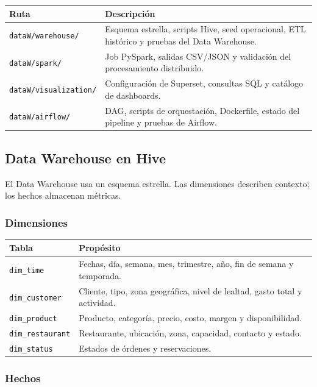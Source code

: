 \documentclass[12pt,letterpaper]{article}
\def\codefile#1{\nolinkurl{#1}}
\begin{document}
\begin{longtable}{p{}p{}}
\toprule
\textbf{Ruta} & \textbf{Descripción}\\
\midrule
\codefile{dataW/warehouse/} & Esquema estrella, scripts Hive, seed operacional, ETL histórico y pruebas del Data Warehouse.\\
\codefile{dataW/spark/} & Job PySpark, salidas CSV/JSON y validación del procesamiento distribuido.\\
\codefile{dataW/visualization/} & Configuración de Superset, consultas SQL y catálogo de dashboards.\\
\codefile{dataW/airflow/} & DAG, scripts de orquestación, Dockerfile, estado del pipeline y pruebas de Airflow.\\
\bottomrule
\end{longtable}

\subsection{Data Warehouse en Hive}

El Data Warehouse usa un esquema estrella. Las dimensiones describen contexto; los hechos almacenan métricas.

\subsubsection{Dimensiones}

\begin{longtable}{p{}p{}}
\toprule
\textbf{Tabla} & \textbf{Propósito}\\
\midrule
\codefile{dim\_time} & Fechas, día, semana, mes, trimestre, año, fin de semana y temporada.\\
\codefile{dim\_customer} & Cliente, tipo, zona geográfica, nivel de lealtad, gasto total y actividad.\\
\codefile{dim\_product} & Producto, categoría, precio, costo, margen y disponibilidad.\\
\codefile{dim\_restaurant} & Restaurante, ubicación, zona, capacidad, contacto y estado.\\
\codefile{dim\_status} & Estados de órdenes y reservaciones.\\
\bottomrule
\end{longtable}

\subsubsection{Hechos}
\end{document}

